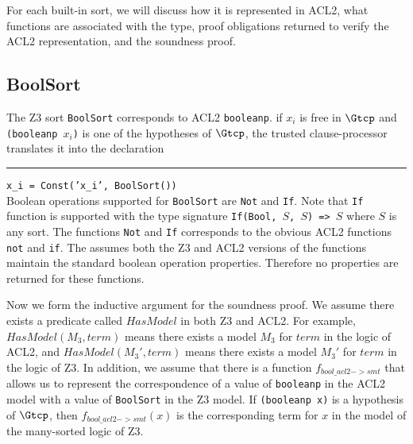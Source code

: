 For each built-in sort, we will discuss how it is represented in ACL2, what
functions are associated with the type, proof obligations returned to verify the
ACL2 representation, and the soundness proof.

\subsection{BoolSort}\label{subsec:bools}
The Z3 sort \texttt{BoolSort} corresponds to ACL2 \texttt{booleanp}.
if $x_i$ is free in $\Gtcp$ and \texttt{(booleanp $x_i$)} is one of the
hypotheses of $\Gtcp$, the trusted clause-processor translates it into the
declaration\\
\rule{2em}{0ex}\texttt{x\_i = Const('x\_i', BoolSort())}\\
Boolean operations supported for \texttt{BoolSort} are \texttt{Not} and
\texttt{If}. Note that \texttt{If} function is supported with the type
signature \texttt{If(Bool, $S$, $S$) => $S$} where $S$ is any sort. The
functions \texttt{Not} and \texttt{If} corresponds to the obvious ACL2 functions
\texttt{not} and \texttt{if}. 
The \smtlink{} assumes both the Z3 and ACL2 versions of the functions maintain
the standard boolean operation properties. Therefore no properties are returned
for these functions.

Now we form the inductive argument for the soundness proof. We assume there
exists a predicate called $HasModel$ in both Z3 and ACL2. For example,
$HasModel(M_3, term)$ means there exists a model $M_3$ for $term$ in the logic
of ACL2, and $HasModel(M_3', term)$ means there exists a model $M_3'$ for
$term$ in the logic of Z3.
In addition, we assume that there is a function $f_{bool\_acl2->smt}$ that
allows us to represent the correspondence of a value of \texttt{booleanp} in the
ACL2 model with a value of \texttt{BoolSort} in the Z3 model.
If \texttt{(booleanp x)} is a hypothesis of $\Gtcp$, then
$f_{bool\_acl2->smt}(x)$ is the corresponding term for $x$ in the model of the
many-sorted logic of Z3.

